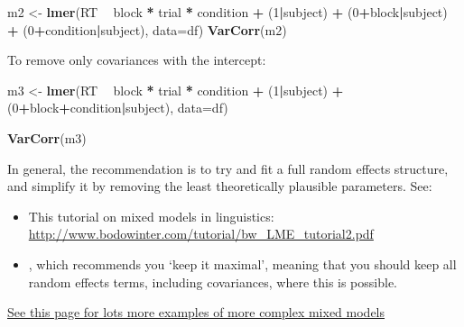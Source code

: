 \documentclass[]{article}
\newenvironment{Shaded}{\begin{snugshade}}{\end{snugshade}}
\newcommand{\DataTypeTok}[1]{\textcolor[rgb]{0.13,0.29,0.53}{#1}}
\newcommand{\DecValTok}[1]{\textcolor[rgb]{0.00,0.00,0.81}{#1}}
\newcommand{\KeywordTok}[1]{\textcolor[rgb]{0.13,0.29,0.53}{\textbf{#1}}}
\newcommand{\NormalTok}[1]{#1}
\newcommand{\OperatorTok}[1]{\textcolor[rgb]{0.81,0.36,0.00}{\textbf{#1}}}
\newcommand{\StringTok}[1]{\textcolor[rgb]{0.31,0.60,0.02}{#1}}
\begin{document}
\begin{Shaded}
\begin{Highlighting}[]
\NormalTok{m2 <-}\StringTok{ }\KeywordTok{lmer}\NormalTok{(RT }\OperatorTok{~}\StringTok{ }\NormalTok{block }\OperatorTok{*}\StringTok{ }\NormalTok{trial }\OperatorTok{*}\StringTok{ }\NormalTok{condition }\OperatorTok{+}
\StringTok{  }\NormalTok{(}\DecValTok{1}\OperatorTok{|}\NormalTok{subject) }\OperatorTok{+}
\StringTok{  }\NormalTok{(}\DecValTok{0}\OperatorTok{+}\NormalTok{block}\OperatorTok{|}\NormalTok{subject) }\OperatorTok{+}
\StringTok{  }\NormalTok{(}\DecValTok{0}\OperatorTok{+}\NormalTok{condition}\OperatorTok{|}\NormalTok{subject), }\DataTypeTok{data=}\NormalTok{df)}
\KeywordTok{VarCorr}\NormalTok{(m2)}
\end{Highlighting}
\end{Shaded}

To remove only covariances with the intercept:

\begin{Shaded}
\begin{Highlighting}[]
\NormalTok{m3 <-}\StringTok{ }\KeywordTok{lmer}\NormalTok{(RT }\OperatorTok{~}\StringTok{ }\NormalTok{block }\OperatorTok{*}\StringTok{ }\NormalTok{trial }\OperatorTok{*}\StringTok{ }\NormalTok{condition }\OperatorTok{+}
\StringTok{  }\NormalTok{(}\DecValTok{1}\OperatorTok{|}\NormalTok{subject) }\OperatorTok{+}
\StringTok{  }\NormalTok{(}\DecValTok{0}\OperatorTok{+}\NormalTok{block}\OperatorTok{+}\NormalTok{condition}\OperatorTok{|}\NormalTok{subject), }\DataTypeTok{data=}\NormalTok{df)}

\KeywordTok{VarCorr}\NormalTok{(m3)}
\end{Highlighting}
\end{Shaded}

In general, the recommendation is to try and fit a full random effects
structure, and simplify it by removing the least theoretically plausible
parameters. See:

\begin{itemize}
\item
  This tutorial on mixed models in linguistics:
  \url{http://www.bodowinter.com/tutorial/bw_LME_tutorial2.pdf}
\item
  \citet{barr2013random}, which recommends you `keep it maximal', meaning that you
  should keep all random effects terms, including covariances, where this is
  possible.
\end{itemize}

\href{http://rpsychologist.com/r-guide-longitudinal-lme-lmer}{See this page for lots more examples of more complex mixed models}
\end{document}
